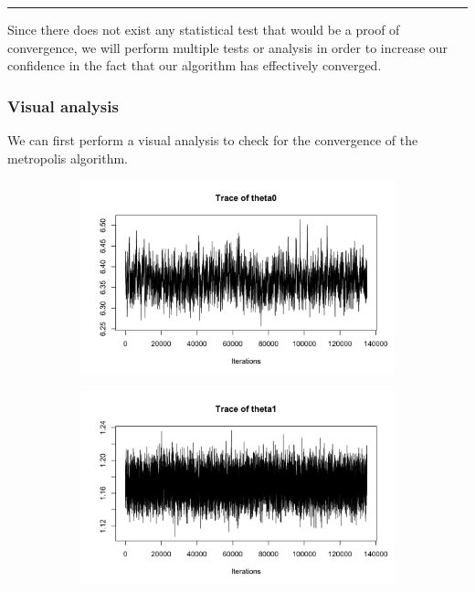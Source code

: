 \begin{center}\rule{6cm}{0.4pt}\end{center}

Since there does not exist any statistical test that would be a proof of convergence, we will perform multiple tests or analysis in order to increase our confidence in the fact that our algorithm has effectively converged.

\subsubsection*{Visual analysis}

We can first perform a visual analysis to check for the convergence of the metropolis algorithm.

\begin{figure}[H]
	\centering
	\begin{subfigure}{0.3\textwidth}
		\centering
		\includegraphics{figures/metropolis_cw_traceplot_theta0}
	\end{subfigure}
	\begin{subfigure}{0.3\textwidth}
		\centering
		\includegraphics{figures/metropolis_cw_traceplot_theta1}

\end{subfigure}
\end{figure}
